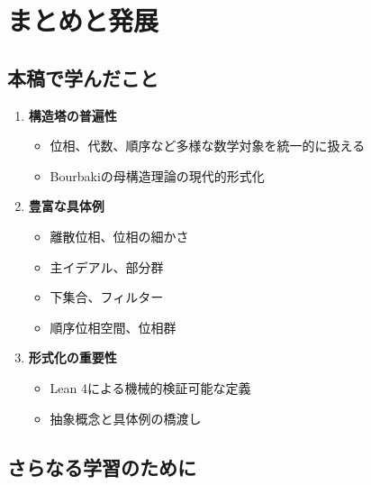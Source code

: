\documentclass[a4paper,11pt,ja=standard]{bxjsarticle}
\theoremstyle{definition}
\begin{document}
\section{まとめと発展}

\subsection{本稿で学んだこと}

\begin{enumerate}
    \item \textbf{構造塔の普遍性}
    \begin{itemize}
        \item 位相、代数、順序など多様な数学対象を統一的に扱える
        \item Bourbakiの母構造理論の現代的形式化
    \end{itemize}

    \item \textbf{豊富な具体例}
    \begin{itemize}
        \item 離散位相、位相の細かさ
        \item 主イデアル、部分群
        \item 下集合、フィルター
        \item 順序位相空間、位相群
    \end{itemize}

    \item \textbf{形式化の重要性}
    \begin{itemize}
        \item Lean 4による機械的検証可能な定義
        \item 抽象概念と具体例の橋渡し
    \end{itemize}
\end{enumerate}

\subsection{さらなる学習のために}
\end{document}
